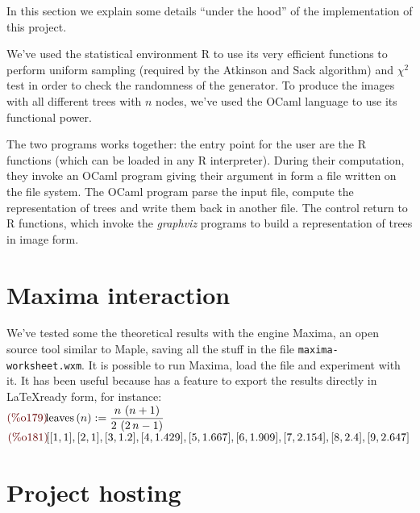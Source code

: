 \documentclass[twoside,openright,titlepage,fleqn,
	headinclude,11pt,a4paper,BCOR5mm,footinclude
	]{scrbook}
\begin{document}
In this section we explain some details ``under the hood'' of the
implementation of this project.

We've used the statistical environment R to use its very efficient
functions to perform uniform sampling (required by the Atkinson and
Sack algorithm) and $\chi^2$ test in order to check the randomness of
the generator. To produce the images with all different trees with $n$
nodes, we've used the OCaml language to use its functional power.

The two programs works together: the entry point for the user are the
R functions (which can be loaded in any R interpreter). During their
computation, they invoke an OCaml program giving their argument in
form a file written on the file system. The OCaml program parse the
input file, compute the representation of trees and write them back in
another file. The control return to R functions, which invoke the
\emph{graphviz} programs to build a representation of trees in image
form.

\section{Maxima interaction}

We've tested some the theoretical results with the engine Maxima, an
open source tool similar to Maple, saving all the stuff in the file
\texttt{maxima-worksheet.wxm}. It is possible to run Maxima, load the
file and experiment with it. It has been useful because has a feature
to export the results directly in \LaTeX ready form, for instance:
\\
\begin{math}\displaystyle
\parbox{8ex}{\color{labelcolor}(\%o179) }
\mathrm{leaves}\left( n\right) :=\frac{n\,\left( n+1\right)
}{2\,\left( 2\,n-1\right) }
\end{math}\\
\begin{math}\displaystyle
\parbox{8ex}{\color{labelcolor}(\%o181) }
[[1,1],[2,1],[3,1.2],[4,1.429],[5,1.667],[6,1.909],[7,2.154],[8,2.4],
[9,2.647]
\end{math}\\

\section{Project hosting}
\end{document}
